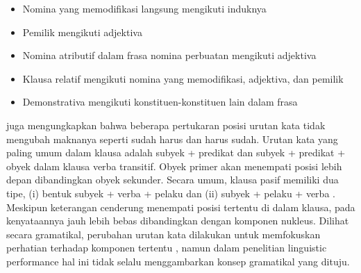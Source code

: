 {\begin{itemize}
\item Nomina yang memodifikasi langsung mengikuti induknya
\item Pemilik mengikuti adjektiva
\item Nomina atributif dalam frasa nomina perbuatan mengikuti adjektiva
\item Klausa relatif mengikuti nomina yang memodifikasi, adjektiva, dan pemilik
\item Demonstrativa mengikuti konstituen-konstituen lain dalam frasa
\end{itemize}
\cite{sneddon2010indonesian} juga mengungkapkan bahwa beberapa pertukaran posisi urutan kata tidak mengubah maknanya seperti sudah harus dan harus sudah. Urutan kata yang paling umum dalam klausa adalah subyek + predikat dan subyek + predikat + obyek dalam klausa verba transitif. Obyek primer akan menempati posisi lebih depan dibandingkan obyek sekunder. Secara umum, klausa pasif memiliki dua tipe, (i) bentuk subyek + verba + pelaku dan (ii) subyek + pelaku + verba \citep{sneddon2010indonesian}. Meskipun keterangan cenderung menempati posisi tertentu di dalam klausa, pada kenyataannya jauh lebih bebas dibandingkan dengan komponen nukleus. Dilihat secara gramatikal, perubahan urutan kata dilakukan untuk memfokuskan perhatian terhadap komponen tertentu \citep{sneddon2010indonesian}, namun dalam penelitian linguistic performance hal ini tidak selalu menggambarkan konsep gramatikal yang dituju.}

